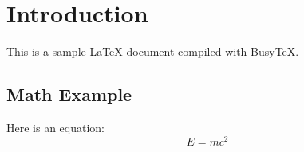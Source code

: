 \documentclass{article}
\begin{document}
\section{Introduction}
This is a sample LaTeX document compiled with BusyTeX.

\subsection{Math Example}
Here is an equation:
\begin{equation}
E = mc^2
\end{equation}
\end{document}
